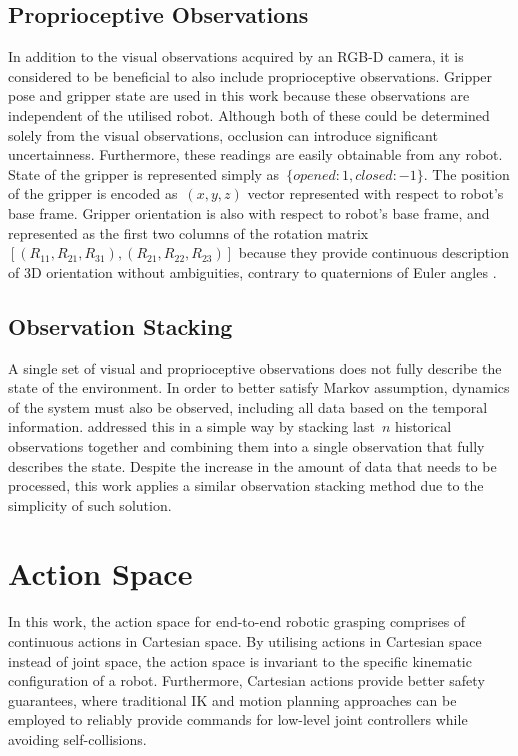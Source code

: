 \subsection{Proprioceptive Observations}

In addition to the visual observations acquired by an RGB-D camera, it is considered to be beneficial to also include proprioceptive observations. Gripper pose and gripper state are used in this work because these observations are independent of the utilised robot. Although both of these could be determined solely from the visual observations, occlusion can introduce significant uncertainness. Furthermore, these readings are easily obtainable from any robot. State of the gripper is represented simply as~\(\{opened: 1, closed: -1\}\). The position of the gripper is encoded as~\((x,y,z)\) vector represented with respect to robot's base frame. Gripper orientation is also with respect to robot's base frame, and represented as the first two columns of the rotation matrix~\([(R_{11},R_{21},R_{31}),(R_{21},R_{22},R_{23})]\) because they provide continuous description of 3D orientation without ambiguities, contrary to quaternions of Euler angles \cite{zhou_continuity_2020}.


\subsection{Observation Stacking}

A single set of visual and proprioceptive observations does not fully describe the state of the environment. In order to better satisfy Markov assumption, dynamics of the system must also be observed, including all data based on the temporal information. \citet{mnih_human-level_2015} addressed this in a simple way by stacking last~\(n\) historical observations together and combining them into a single observation that fully describes the state. Despite the increase in the amount of data that needs to be processed, this work applies a similar observation stacking method due to the simplicity of such solution.


\section{Action Space}

In this work, the action space for end-to-end robotic grasping comprises of continuous actions in Cartesian space. By utilising actions in Cartesian space instead of joint space, the action space is invariant to the specific kinematic configuration of a robot. Furthermore, Cartesian actions provide better safety guarantees, where traditional IK and motion planning approaches can be employed to reliably provide commands for low-level joint controllers while avoiding self-collisions.

